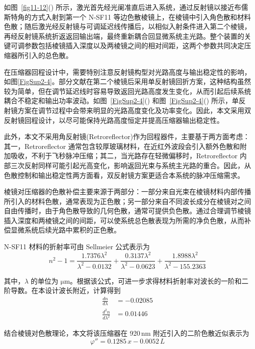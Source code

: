 如图~\ref{fig11-12}() 所示，激光首先经光阑准直后进入系统，通过反射镜以接近布儒斯特角的方式入射到第一个 N-SF11 等边色散棱镜上，在棱镜中引入角色散和材料色散；随后激光经反射镜与可调延迟线传播后，以相似入射条件进入第二个棱镜，再经反射镜系统折返返回输出端，最终重新耦合回显微系统主光路。整个装置的关键可调参数包括棱镜插入深度以及两棱镜之间的相对间距，这两个参数共同决定压缩器所引入的总色散。

在压缩器回程设计中，需要特别注意反射镜构型对光路高度与输出稳定性的影响，如图\ref{FigSup2-4}。部分文献在第二个棱镜后采用单反射镜回折方案，这种结构虽然较为简单，但在调节延迟线时容易导致返回光路高度发生变化，从而引起后续系统耦合不稳定和输出功率波动。如图~\ref{FigSup2-4}() 和图~\ref{FigSup2-4}() 所示，单反射镜方案在调节过程中会带来明显的光路高度变化及功率变化。因此，本文采用双反射镜回程设计，以尽可能保持光路高度恒定并提高压缩器输出稳定性。

此外，本文不采用角反射镜(Retroreflector)作为回程器件，主要基于两方面考虑：其一，Retroreflector 通常包含较厚玻璃材料，在近红外波段会引入额外色散和附加吸收，不利于飞秒脉冲压缩；其二，当光路存在轻微偏移时，Retroreflector 内部三次反射同样可能引起光高变化，影响返回光束与系统主光路的重合。因此，从色散控制和输出稳定性两方面看，双反射镜方案更适合本系统的脉冲压缩需求。

棱镜对压缩器的色散补偿主要来源于两部分：一部分来自光束在棱镜材料内部传播所引入的材料色散，通常表现为正色散；另一部分来自不同波长成分在棱镜对之间自由传播时，由于角色散导致的几何色散，通常可提供负色散。通过合理调节棱镜插入深度和两棱镜之间的间距，可以使系统总色散表现为所需的净负色散，从而补偿显微系统后续光路中累积的正色散。

N-SF11 材料的折射率可由 Sellmeier 公式表示为
\begin{equation}
    n^{2}-1=
    \frac{1.7376\lambda^{2}}{\lambda^{2}-0.0132}
    +\frac{0.3137\lambda^{2}}{\lambda^{2}-0.0623}
    +\frac{1.8988\lambda^{2}}{\lambda^{2}-155.2363}
\end{equation}

其中，$\lambda$ 的单位为 $\mathrm{\mu m}$。根据该公式，可进一步求得材料折射率对波长的一阶和二阶导数。在本设计波长附近，计算得到
\begin{align}
    \frac{dn}{d\lambda} &= -0.02085\\
    \frac{d^{2}n}{d\lambda^{2}} &= 0.01446
\end{align}

结合棱镜对色散理论，本文将该压缩器在 920\,nm 附近引入的二阶色散近似表示为
\begin{equation}
    \varphi'' = 0.1285\,x - 0.0052\,L
\end{equation}

